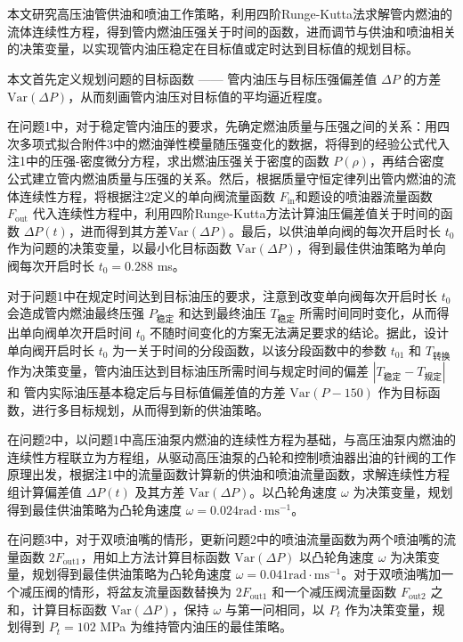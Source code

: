 \documentclass[12pt,a4paper]{article}
\begin{document}
\begin{center}
{}\\
~\\
{}
\end{center}

本文研究高压油管供油和喷油工作策略，利用四阶Runge-Kutta法求解管内燃油的流体连续性方程，得到管内燃油压强关于时间的函数，进而调节与供油和喷油相关的决策变量，以实现管内油压稳定在目标值或定时达到目标值的规划目标。

本文首先定义规划问题的目标函数 —— 管内油压与目标压强偏差值 $\Delta P$ 的方差 $\text{Var}(\Delta P)$，从而刻画管内油压对目标值的平均逼近程度。

在问题1中，对于稳定管内油压的要求，先确定燃油质量与压强之间的关系：用四次多项式拟合附件3中的燃油弹性模量随压强变化的数据，将得到的经验公式代入注1中的压强-密度微分方程，求出燃油压强关于密度的函数 $P(\rho)$，再结合密度公式建立管内燃油质量与压强的关系。然后，根据质量守恒定律列出管内燃油的流体连续性方程，将根据注2定义的单向阀流量函数 $F_{\text{in}}$和题设的喷油器流量函数 $F_{\text{out}}$ 代入连续性方程中，利用四阶Runge-Kutta方法计算油压偏差值关于时间的函数 $\Delta P(t)$，进而得到其方差$\text{Var}(\Delta P)$。最后，以供油单向阀的每次开启时长 $t_0$ 作为问题的决策变量，以最小化目标函数 $\text{Var}(\Delta P)$，得到最佳供油策略为单向阀每次开启时长 $t_0=0.288$ ms。

对于问题1中在规定时间达到目标油压的要求，注意到改变单向阀每次开启时长 $t_0$ 会造成管内燃油最终压强 $P_{\text{稳定}}$ 和达到最终油压 $T_{\text{稳定}}$ 所需时间同时变化，从而得出单向阀单次开启时间 $t_0$ 不随时间变化的方案无法满足要求的结论。据此，设计单向阀开启时长 $t_0$ 为一关于时间的分段函数，以该分段函数中的参数 $t_{01}$ 和 $T_{\text{转换}}$ 作为决策变量，管内油压达到目标油压所需时间与规定时间的偏差 $|T_{\text{稳定}}-T_{\text{规定}}|$ 和 管内实际油压基本稳定后与目标值偏差值的方差 $\text{Var}(P-150)$ 作为目标函数，进行多目标规划，从而得到新的供油策略。

在问题2中，以问题1中高压油泵内燃油的连续性方程为基础，与高压油泵内燃油的连续性方程联立为方程组，从驱动高压油泵的凸轮和控制喷油器出油的针阀的工作原理出发，根据注1中的流量函数计算新的供油和喷油流量函数，求解连续性方程组计算偏差值 $\Delta P(t)$ 及其方差 $\text{Var}(\Delta P)$。以凸轮角速度 $\omega$ 为决策变量，规划得到最佳供油策略为凸轮角速度 $\omega=0.024\text{rad}\cdot\text{ms}^{-1}$。

在问题3中，对于双喷油嘴的情形，更新问题2中的喷油流量函数为两个喷油嘴的流量函数 $2F_{\text{out}1}$，用如上方法计算目标函数 $\text{Var}(\Delta P)$ 以凸轮角速度 $\omega$ 为决策变量，规划得到最佳供油策略为凸轮角速度 $\omega=0.041\text{rad}\cdot\text{ms}^{-1}$。对于双喷油嘴加一个减压阀的情形，将盆友流量函数替换为 $2F_{\text{out}1}$ 和一个减压阀流量函数 $F_{\text{out}2}$ 之和，计算目标函数 $\text{Var}(\Delta P)$，保持 $\omega$ 与第一问相同，以 $P_t$ 作为决策变量，规划得到 $P_t=102$ MPa 为维持管内油压的最佳策略。
\end{document}
